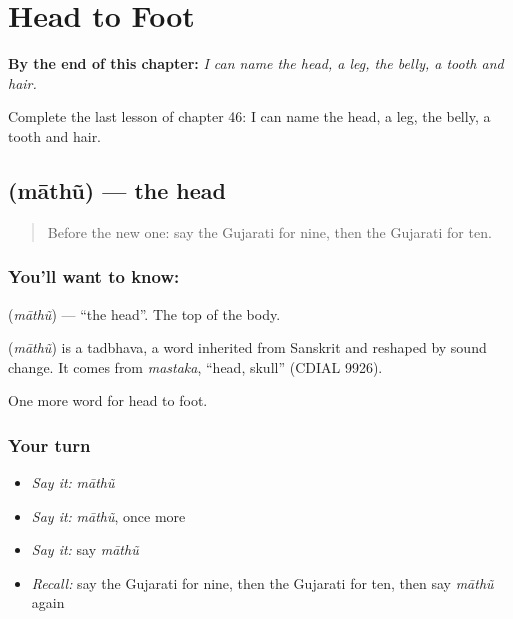 
\chapter{Head to Foot}
\label{ch:gu-head-to-foot}

\begin{chapteropening}
\textbf{By the end of this chapter:} \emph{I can name the head, a leg, the belly, a tooth and hair.}

Complete the last lesson of chapter 46: I can name the head, a leg, the belly, a tooth and hair.
\end{chapteropening}

\section[\texorpdfstring{\gu{માથું} (māthũ)}{માથું (māthũ)}]{ (māthũ) — the head}

\label{lesson:GU-C46-head}



\begin{quote}
Before the new one: say the Gujarati for nine, then the Gujarati for ten.
\end{quote}

\subsection*{You'll want to know: }
\textbf{} (\emph{māthũ}) — \textquotedblleft{}the head\textquotedblright{}. The top of the body.

\begin{cousinweb}
\textbf{} (\emph{māthũ}) is a tadbhava, a word inherited from Sanskrit and reshaped by sound change. It comes from \emph{mastaka}, \textquotedblleft{}head, skull\textquotedblright{} (CDIAL 9926).
\end{cousinweb}

\begin{grammarlens}[title={What you've built}]
One more word for head to foot.
\end{grammarlens}

\subsection*{Your turn}
\begin{itemize}
\raggedright
  \item \emph{Say it:} \emph{māthũ}
  \item \emph{Say it:} \emph{māthũ}, once more
  \item \emph{Say it:} say \emph{māthũ}
  \item \emph{Recall:} say the Gujarati for nine, then the Gujarati for ten, then say \emph{māthũ} again
\end{itemize}

